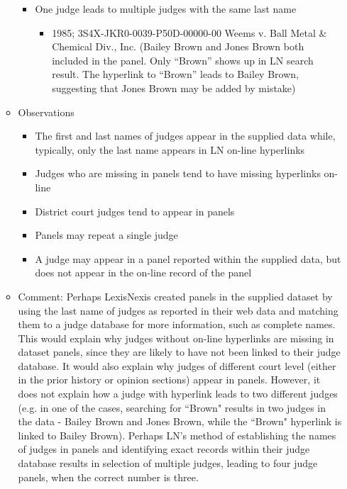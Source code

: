\documentclass[10pt, letterpaper]{article}
\begin{document}
\begin{spacing}{1.0}
\begin{itemize}
\begin{itemize}
\begin{itemize}
            \item One judge leads to multiple judges with the same last name
            \begin{itemize}                     
                \item 1985; 3S4X-JKR0-0039-P50D-00000-00 Weems v. Ball Metal \& Chemical Div., Inc.
                (Bailey Brown and Jones Brown both included in the panel. Only “Brown” shows up in LN search result. The hyperlink to “Brown” leads to Bailey Brown, suggesting that Jones Brown may be added by mistake)
            \end{itemize}
        \end{itemize}
        
        \item Observations
        \begin{itemize}
            \item The first and last names of judges appear in the supplied data while, typically, only the last name appears in LN on-line hyperlinks
            \item Judges who are missing in panels tend to have missing hyperlinks on-line
            \item District court judges tend to appear in panels
            \item Panels may repeat a single judge
            \item A judge may appear in a panel reported within the supplied data, but does not appear in the on-line record of the panel
        \end{itemize}
    
        \item Comment:  Perhaps LexisNexis created panels in the supplied dataset by using the last name of judges as reported in their web data and matching them to a judge database for more information, such as complete names. This would explain why judges without on-line hyperlinks are missing in dataset panels, since they are likely to have not been linked to their judge database. It would also explain why judges of different court level (either in the prior history or opinion sections) appear in panels. However, it does not explain how a judge with hyperlink leads to two different judges (e.g. in one of the cases, searching for ``Brown" results in two judges in the data - Bailey Brown and Jones Brown, while the ``Brown" hyperlink is linked to Bailey Brown). Perhaps LN's method of establishing the names of judges in panels and identifying exact records within their judge database results in selection of multiple judges, leading to four judge panels, when the correct number is three. 


\end{itemize}
\end{itemize}
\end{spacing}
\end{document}
